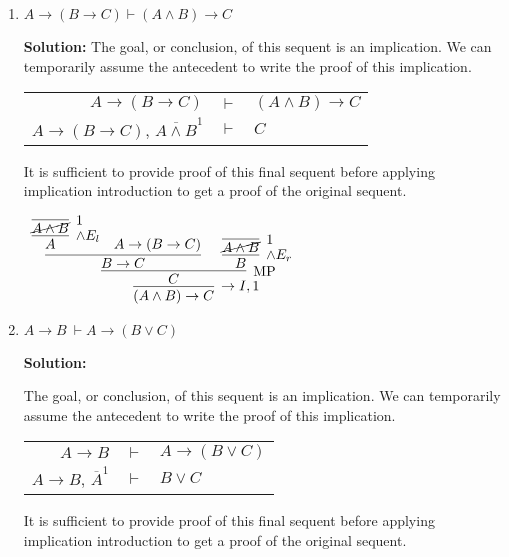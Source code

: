 \documentclass[11pt]{report}
\newcommand{\temp}[2]{{\overline{#2}}^{#1}}
\begin{document}
\begin{enumerate}
\begin{enumerate}
		\item $A \rightarrow ( B \rightarrow  C) \vdash (A \land B) \rightarrow C$
		
		\textbf{Solution:}
		The goal, or conclusion, of this sequent is an implication. We can temporarily assume the antecedent to write the proof of this implication. 

		\begin{center}
			\begin{tabular}{r c l}
				$A \rightarrow ( B \rightarrow  C)$ & $\vdash$ & $(A \land B) \rightarrow C$ \\
				$A \rightarrow ( B \rightarrow  C)$, $\temp{1}{A \land B}$ & $\vdash$ & $C$ \\				
			\end{tabular}
		\end{center}

		It is sufficient to provide proof of this final sequent before applying implication introduction to get a proof of the original sequent.

			\begin{center}
				$\begin{array}{c}
					\infer[\to I,1]{(A \land B) \to C}
						{\infer[\MP]{C}
							{\infer[]{B\to C}
								{\infer[\land E_{l}]{A}{\infer[1]{\cancel{A \land B}}{}} & A \to (B \to C)}
							&
							\infer[\land E_{r}]{B}
								{\infer[1]{\cancel{A \land B}}{}}}}
				\end{array}$
			\end{center}

		\item $A \to B \ \vdash A \to (B \lor C)$
		
		\textbf{Solution:}
		
		The goal, or conclusion, of this sequent is an implication. We can temporarily assume the antecedent to write the proof of this implication. 

		\begin{center}
			\begin{tabular}{r c l}
				$A \rightarrow  B$ & $\vdash$ & $A \to (B \lor C)$ \\
				$A \rightarrow  B$, $\temp{1}{A}$ & $\vdash$ & $B \lor C$ \\				
			\end{tabular}
		\end{center}

		It is sufficient to provide proof of this final sequent before applying implication introduction to get a proof of the original sequent.


\end{enumerate}
\end{enumerate}
\end{document}
